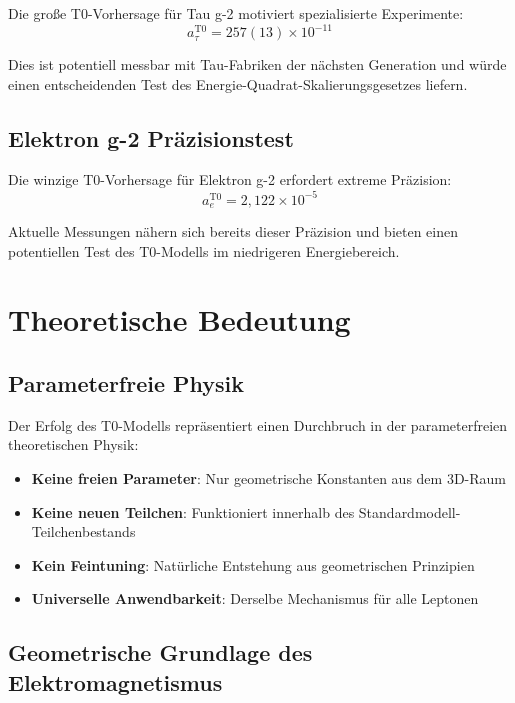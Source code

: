 \documentclass[12pt,a4paper]{report}
\begin{document}
Die große T0-Vorhersage für Tau g-2 motiviert spezialisierte Experimente:
\begin{equation}
	a_\tau^{\text{T0}} = 257(13) \times 10^{-11}
	\label{eq:tau_prediction}
\end{equation}

Dies ist potentiell messbar mit Tau-Fabriken der nächsten Generation und würde einen entscheidenden Test des Energie-Quadrat-Skalierungsgesetzes liefern.

\subsection{Elektron g-2 Präzisionstest}
\label{subsec:electron_g2_precision}

Die winzige T0-Vorhersage für Elektron g-2 erfordert extreme Präzision:
\begin{equation}
	a_e^{\text{T0}} = 2,122 \times 10^{-5}
	\label{eq:electron_prediction}
\end{equation}

Aktuelle Messungen nähern sich bereits dieser Präzision und bieten einen potentiellen Test des T0-Modells im niedrigeren Energiebereich.

\section{Theoretische Bedeutung}
\label{sec:theoretical_significance}

\subsection{Parameterfreie Physik}
\label{subsec:parameter_free_physics}

Der Erfolg des T0-Modells repräsentiert einen Durchbruch in der parameterfreien theoretischen Physik:
\begin{itemize}
	\item \textbf{Keine freien Parameter}: Nur geometrische Konstanten aus dem 3D-Raum
	\item \textbf{Keine neuen Teilchen}: Funktioniert innerhalb des Standardmodell-Teilchenbestands
	\item \textbf{Kein Feintuning}: Natürliche Entstehung aus geometrischen Prinzipien
	\item \textbf{Universelle Anwendbarkeit}: Derselbe Mechanismus für alle Leptonen
\end{itemize}

\subsection{Geometrische Grundlage des Elektromagnetismus}
\label{subsec:geometric_electromagnetism}
\end{document}
